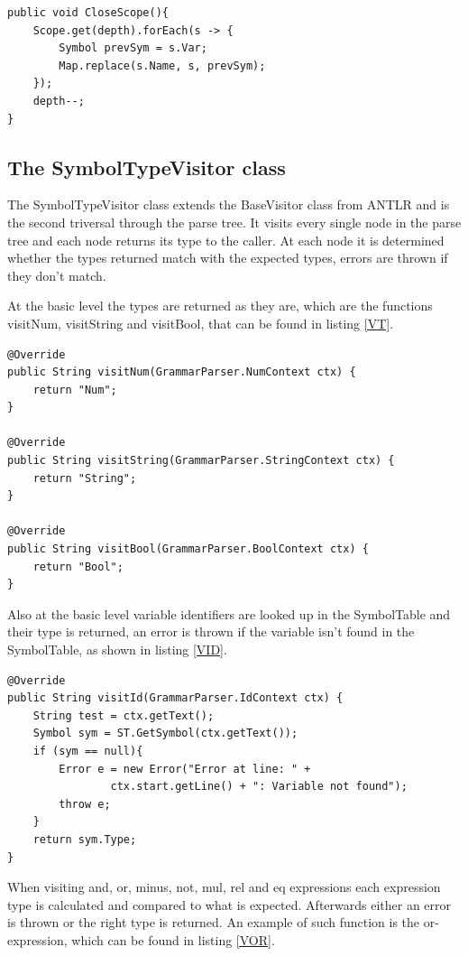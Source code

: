 \begin{lstlisting}[caption={CloseScope function}, label={CS}]
public void CloseScope(){
    Scope.get(depth).forEach(s -> {
        Symbol prevSym = s.Var;
        Map.replace(s.Name, s, prevSym);
    });
    depth--;
}
\end{lstlisting}



\subsection{The SymbolTypeVisitor class}
The SymbolTypeVisitor class extends the BaseVisitor class from ANTLR and is the second triversal through the parse tree. It visits every single node in  the parse tree and each node returns its type to the caller. At each node it is determined whether the types returned match with the expected types, errors are thrown if they don't match.

At the basic level the types are returned as they are, which are the functions visitNum, visitString and visitBool, that can be found in listing \ref{VT}.

\begin{lstlisting}[caption={SymbolTypeVisitor - visitNum, visitString and visitBool functions}, label={VT}]
@Override
public String visitNum(GrammarParser.NumContext ctx) {
    return "Num";
}

@Override
public String visitString(GrammarParser.StringContext ctx) {
    return "String";
}

@Override
public String visitBool(GrammarParser.BoolContext ctx) {
    return "Bool";
}
\end{lstlisting}

Also at the basic level variable identifiers are looked up in the SymbolTable and their type is returned, an error is thrown if the variable isn't found in the SymbolTable, as shown in listing \ref{VID}.

\begin{lstlisting}[caption={SymbolTypeVisitor - visitId function}, label={VID}]
@Override
public String visitId(GrammarParser.IdContext ctx) {
    String test = ctx.getText();
    Symbol sym = ST.GetSymbol(ctx.getText());
    if (sym == null){
        Error e = new Error("Error at line: " +
                ctx.start.getLine() + ": Variable not found");
        throw e;
    }
    return sym.Type;
}
\end{lstlisting}

When visiting and, or, minus, not, mul, rel and eq expressions each expression type is calculated and compared to what is expected. Afterwards either an error is thrown or the right type is returned. An example of such function is the or-expression, which can be found in listing \ref{VOR}.

